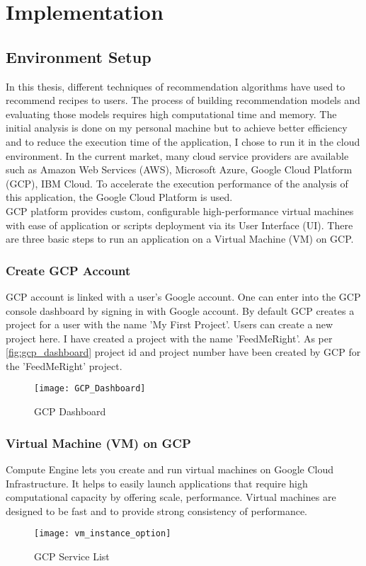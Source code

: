 \chapter{Implementation}
\label{ch:impl}
\section{Environment Setup}
In this thesis, different techniques of recommendation algorithms have used to recommend recipes to users. The process of building recommendation models and evaluating those models requires high computational time and memory. The initial analysis is done on my personal machine but to achieve better efficiency and to reduce the execution time of the application, I chose to run it in the cloud environment.  In the current market, many cloud service providers are available such as Amazon Web Services (AWS), Microsoft Azure, Google Cloud Platform (GCP), IBM Cloud. To accelerate the execution performance of the analysis of this application, the Google Cloud Platform is used. \\
\noindent GCP platform provides custom, configurable high-performance virtual machines with ease of application or scripts deployment via its User Interface (UI). There are three basic steps to run an application on a Virtual Machine (VM) on GCP. 
\subsection{Create GCP Account}
GCP account is linked with a user's Google account. One can enter into the GCP console dashboard by signing in with Google account. By default GCP creates a project for a user with the name 'My First Project'. Users can create a new project here. I have created a project with the name 'FeedMeRight'. As per \autoref{fig:gcp_dashboard} project id and project number have been created by GCP for the 'FeedMeRight' project. 
\begin{figure}[H]
	\centering
	\texttt{[image: GCP\_Dashboard]}
	\caption{GCP Dashboard}
	\label{fig:gcp_dashboard}
\end{figure}
  
\subsection{Virtual Machine (VM) on GCP}
Compute Engine lets you create and run virtual machines on Google Cloud Infrastructure. It helps to easily launch applications that require high computational capacity by offering scale, performance. Virtual machines are designed to be fast and to provide strong consistency of performance. 
\begin{figure}[H]
	\centering
	\texttt{[image: vm\_instance\_option]}
	\caption{GCP Service List}
	\label{fig:vm_instance_option}
\end{figure}

